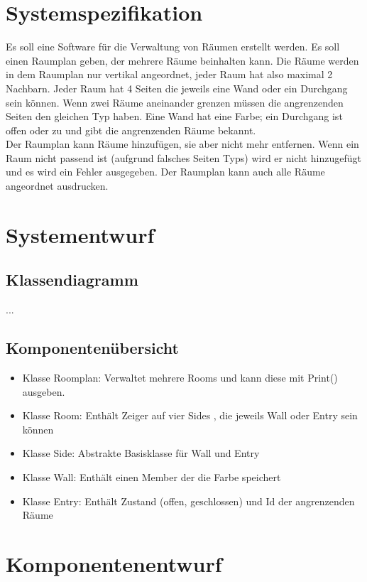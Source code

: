 \documentclass[12pt,a4paper]{article}
\begin{document}
\section{Systemspezifikation}
Es soll eine Software für die Verwaltung von Räumen erstellt werden. Es soll einen Raumplan geben, der mehrere Räume beinhalten kann. Die Räume werden in dem Raumplan nur
vertikal angeordnet, jeder Raum hat also maximal 2 Nachbarn. Jeder Raum hat 4 Seiten die jeweils eine Wand oder ein Durchgang sein können. Wenn zwei Räume aneinander grenzen 
müssen die angrenzenden Seiten den gleichen Typ haben. Eine Wand hat eine Farbe; ein Durchgang ist offen oder zu und gibt die angrenzenden Räume bekannt. \\
Der Raumplan kann Räume hinzufügen, sie aber nicht mehr entfernen. Wenn ein Raum nicht passend ist (aufgrund falsches Seiten Typs) wird er nicht hinzugefügt und
es wird ein Fehler ausgegeben. 
Der Raumplan kann auch alle Räume angeordnet ausdrucken. \\


\newpage
\section {Systementwurf}
\subsection {Klassendiagramm}
...
\subsection {Komponentenübersicht}
\begin {itemize} 
	\item Klasse Roomplan:
	Verwaltet mehrere Rooms und kann diese mit Print() ausgeben.
	\item Klasse Room:
	Enthält Zeiger auf vier Sides , die jeweils Wall oder Entry sein können
	\item Klasse Side:
	Abstrakte Basisklasse für Wall und Entry
	\item Klasse Wall: 
	Enthält einen Member der die Farbe speichert
	\item Klasse Entry: 
	Enthält Zustand (offen, geschlossen) und Id der angrenzenden Räume

\end {itemize}

\newpage
\section {Komponentenentwurf}
\end{document}
